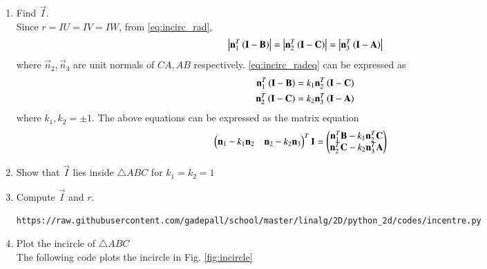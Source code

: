 \documentclass[journal,12pt,twocolumn]{IEEEtran}
\renewcommand\thesection{\arabic{section}}
\begin{document}
\begin{enumerate}[label=\thesection.\arabic*
,ref=\thesection.\theenumi]
\begin{align}
\\
\implies \vec{n}^T\brak{\vec{I}-\vec{B}}&=\lambda\norm{\vec{n}}^2
\\
\implies r = \abs{\lambda}\norm{\vec{n}}&=\frac{\abs{\vec{n}^T\brak{\vec{I}-\vec{B}}}}{\norm{\vec{n}}}
\end{align}
from \eqref{eq:incirc_r}.  Letting 
\begin{align}
\norm{\vec{n}_1}&= \frac{\vec{n}}{\norm{\vec{n}}},
\\
r &= \abs{\vec{n}_1^T\brak{\vec{I}-\vec{B}}}
\label{eq:incirc_rad}
\end{align}
\item Find $\vec{I}$.
\\
\solution Since $r = IU = IV = IW$, from \eqref{eq:incirc_rad},
\begin{align}
\left\vert\mathbf{n}_1^T\left(\mathbf{I}-\mathbf{B}\right)\right\vert = \left\vert\mathbf{n}_2^T\left(\mathbf{I}-\mathbf{C}\right)\right\vert = 
\left\vert\mathbf{n}_3^T\left(\mathbf{I}-\mathbf{A}\right)\right\vert
\label{eq:incirc_radeq}
\end{align}
%
where $\vec{n}_2, \vec{n}_3$ are unit normals of $CA, AB$ respectively.  \eqref{eq:incirc_radeq} can be 
expressed as 
\begin{align}
\mathbf{n}_1^T\left(\mathbf{I}-\mathbf{B}\right) &= k_1\mathbf{n}_2^T\left(\mathbf{I}-\mathbf{C}\right) 
\\
\mathbf{n}_2^T\left(\mathbf{I}-\mathbf{C}\right) &= k_2\mathbf{n}_3^T\left(\mathbf{I}-\mathbf{A}\right)
\label{eq:incirc_k1k2}
\end{align}
%
where $k_1,k_2 = \pm 1$. The above equations can be expressed as the matrix equation
\begin{align}
\begin{pmatrix}\mathbf{n}_1-k_1\mathbf{n}_2 & \mathbf{n}_2 - k_2\mathbf{n}_3\end{pmatrix}^T\mathbf{I} &= 
\begin{pmatrix}\mathbf{n}_1^T\mathbf{B}-k_1\mathbf{n}_2^T\mathbf{C} \\ \mathbf{n}_2^T \mathbf{C} - k_2\mathbf{n}_3^T\mathbf{A}\end{pmatrix}
\label{eq:incirc_k1k2fin}
\end{align}
\item Show that $\vec{I}$ lies inside $\triangle ABC$ for $k_1=k_2=1$
\item Compute $\vec{I}$ and $r$.
\\
\solution
\begin{lstlisting}
https://raw.githubusercontent.com/gadepall/school/master/linalg/2D/python_2d/codes/incentre.py
\end{lstlisting}
\item Plot the incircle of $\triangle ABC$
\\
\solution The following code plots the incircle in Fig. \ref{fig:incircle}
\begin{lstlisting}

\end{lstlisting}
\end{enumerate}
\end{document}
